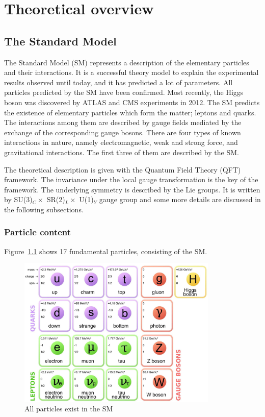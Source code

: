 \chapter{Theoretical overview}
\label{chap:theory}
\section{The Standard Model}
\label{sec:SM}
The Standard Model (SM) represents a description of the elementary particles and their interactions.
It is a successful theory model to explain the experimental results observed until today, and it has predicted a lot of parameters.
All particles predicted by the SM have been confirmed. Most recently, the Higgs boson was discovered by ATLAS and CMS experiments in 2012.
The SM predicts the existence of elementary particles which form the matter; leptons and quarks.
The interactions among them are described by gauge fields mediated by the exchange of the corresponding gauge bosons.
There are four types of known interactions in nature, namely electromagnetic, weak and strong force, and gravitational interactions.
The first three of them are described by the SM.

The theoretical description is given with the Quantum Field Theory (QFT) framework. 
The invariance under the local gauge transformation is the key of the framework. 
The underlying symmetry is described by the Lie groups. 
It is written by SU(3)$_C \times$ SR(2)$_L \times$ U(1)$_Y$ gauge group and some more details are discussed in the following subsections. 

\subsection{Particle content}
Figure~\ref{fig:SM} shows 17 fundamental particles, consisting of the SM.
\begin{figure}[tbp]
\begin{center}
 \includegraphics[width=0.85\textwidth,keepaspectratio]{figures/SM}
\caption{
All particles exist in the SM %
}
\label{fig:SM}
\end{center}
\end{figure}

